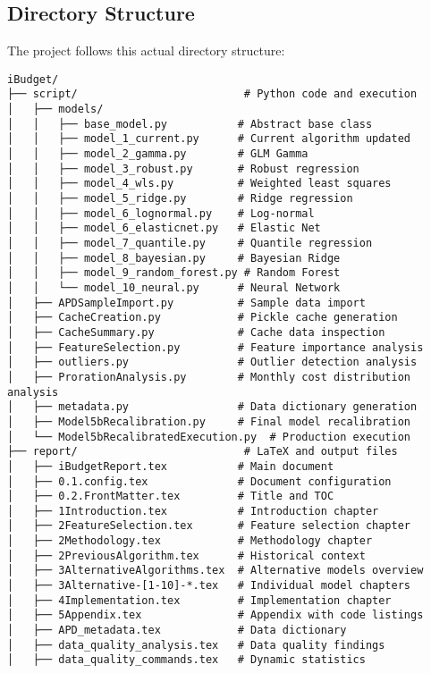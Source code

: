 \subsection{Directory Structure}

The project follows this actual directory structure:

\begin{verbatim}
iBudget/
├── script/                          # Python code and execution
│   ├── models/
│   │   ├── base_model.py           # Abstract base class
│   │   ├── model_1_current.py      # Current algorithm updated
│   │   ├── model_2_gamma.py        # GLM Gamma
│   │   ├── model_3_robust.py       # Robust regression
│   │   ├── model_4_wls.py          # Weighted least squares
│   │   ├── model_5_ridge.py        # Ridge regression
│   │   ├── model_6_lognormal.py    # Log-normal
│   │   ├── model_6_elasticnet.py   # Elastic Net
│   │   ├── model_7_quantile.py     # Quantile regression
│   │   ├── model_8_bayesian.py     # Bayesian Ridge
│   │   ├── model_9_random_forest.py # Random Forest
│   │   └── model_10_neural.py      # Neural Network
│   ├── APDSampleImport.py          # Sample data import
│   ├── CacheCreation.py            # Pickle cache generation
│   ├── CacheSummary.py             # Cache data inspection
│   ├── FeatureSelection.py         # Feature importance analysis
│   ├── outliers.py                 # Outlier detection analysis
│   ├── ProrationAnalysis.py        # Monthly cost distribution analysis
│   ├── metadata.py                 # Data dictionary generation
│   ├── Model5bRecalibration.py     # Final model recalibration
│   └── Model5bRecalibratedExecution.py  # Production execution
├── report/                          # LaTeX and output files
│   ├── iBudgetReport.tex           # Main document
│   ├── 0.1.config.tex              # Document configuration
│   ├── 0.2.FrontMatter.tex         # Title and TOC
│   ├── 1Introduction.tex           # Introduction chapter
│   ├── 2FeatureSelection.tex       # Feature selection chapter
│   ├── 2Methodology.tex            # Methodology chapter
│   ├── 2PreviousAlgorithm.tex      # Historical context
│   ├── 3AlternativeAlgorithms.tex  # Alternative models overview
│   ├── 3Alternative-[1-10]-*.tex   # Individual model chapters
│   ├── 4Implementation.tex         # Implementation chapter
│   ├── 5Appendix.tex               # Appendix with code listings
│   ├── APD_metadata.tex            # Data dictionary
│   ├── data_quality_analysis.tex   # Data quality findings
│   ├── data_quality_commands.tex   # Dynamic statistics

\end{verbatim}
